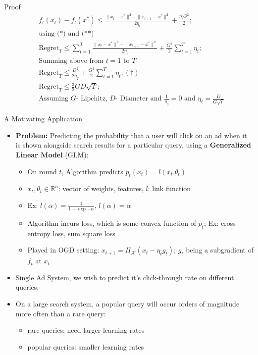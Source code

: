 \documentclass[
	11pt, %
]{beamer}
\begin{document}
\begin{frame}{Proof}
    $$
    \begin{aligned}
        & f_t(x_t) - f_t (x^*) \le \frac{\|x_t - x^*\|^2 - \|x_{t+1} - x^*\|^2}{2\eta_t} + \frac{\eta_t G^2}{2}; \\
        & \text{using (*) and (**)} \\
        & \text{Regret}_T \le \sum_{t = 1}^{T} \frac{\|x_t - x^*\|^2 - \|x_{t+1} - x^*\|^2}{2\eta_t} + \frac{G^2}{2} \sum_{t = 1}^{T} \eta_t; \\
        & \text{Summing above from $t=1$ to $T$} \\
        & \text{Regret}_T \le \frac{D^2}{2 \eta_T} + \frac{G^2}{2} \sum_{t = 1}^{T} \eta_t; (\dag) \\
        & \text{Regret}_T \le \frac{3}{2} GD\sqrt{T}; \\
        & \text{Assuming $G$- Lipchitz, $D$- Diameter and $\frac{1}{\eta_0} = 0$ and $\eta_t = \frac{D}{G\sqrt{t}}$}
    \end{aligned}
    $$
\end{frame}

\begin{frame}{A Motivating Application}
    \begin{itemize}
        \item \textbf{Problem:} Predicting the probability that a user will click on an ad when it is shown alongside search results for a particular query, using a \textbf{Generalized Linear Model} (GLM):
        \begin{itemize}
            \item On round $t$, Algorithm predicts $p_t(x_t) = l(x_t . \theta_t)$
            \item $x_t, \theta_t \in \mathbb{R}^n$: vector of weights, features, $l$: link function
            \item Ex: $l(\alpha) = \frac{1}{1 + \exp{-\alpha}}$, $l(\alpha) = \alpha$
            \item Algorithm incurs loss, which is some convex function of $p_t$; Ex: cross entropy loss, sum square loss
            \item Played in OGD setting: $x_{t+1} = \Pi_{\mathcal{K}} (x_t - \eta_t g_t)$; $g_t$ being a subgradient of $f_t$ at $x_t$
        \end{itemize}
        \item Single Ad System, we wish to predict it's click-through rate on different queries.
        \item On a large search system, a popular query will occur orders of magnitude more often than a rare query:
        \begin{itemize}
            \item rare queries: need larger learning rates
            \item popular queries: smaller learning rates
        \end{itemize}
    \end{itemize}
\end{frame}
\end{document}
